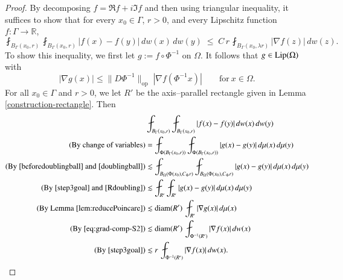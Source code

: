 \documentclass[12pt]{amsart}
\begin{document}
\begin{proof}
By decomposing $f=\Re f+i\Im f$ and then using triangular inequality, it suffices to show that for every $x_0\in\Gamma$, $r>0$, and every Lipschitz function $f:\Gamma\to\mathbb{R}$,
\begin{equation}\label{eq:Poincare11-chamber}
\fint_{B_\Gamma(x_0,r)}\fint_{B_\Gamma(x_0,r)}
\big|f(x)-f(y)\big|\,dw(x)\,dw(y)
\;\le\;
C\,r\,\fint_{B_\Gamma(x_0,\lambda r)} |\nabla f(z)|\,dw(z).
\end{equation}
To show this inequality, we first let $g:=f\circ\Phi^{-1}$ on $\Omega$. It follows that $g\in{\rm Lip}(\Omega)$ with
\begin{equation}\label{eq:grad-comp-S2}
|\nabla g(x)|
 \le
\|D\Phi^{-1}\|_{\mathrm{op}}\;|\nabla f(\Phi^{-1}x)|
\qquad\text{for}\ x\in\Omega.
\end{equation}
For all $x_0\in\Gamma$ and $r>0$, we let $R'$ be the axis--parallel rectangle given in Lemma \ref{construction-rectangle}. Then
\begin{align}\label{plugterm}
&\fint_{B_\Gamma(x_0,r)}\fint_{B_\Gamma(x_0,r)}|f(x)-f(y)|\,dw(x)\,dw(y)\nonumber\\
(\text{By change of variables})&=
\fint_{\Phi(B_\Gamma(x_0,r))}\fint_{\Phi(B_\Gamma(x_0,r))}|g(x)-g(y)|\,d\mu(x)\,d\mu(y)\nonumber\\
(\text{By}\ \eqref{beforedoublingball}\ \text{and}\ \eqref{doublingball})&\lesssim
\fint_{B_{\Omega}(\Phi(x_0),C_\Phi r)}\fint_{B_{\Omega}(\Phi(x_0),C_\Phi r)}|g(x)-g(y)|\,d\mu(x)\,d\mu(y)\nonumber\\
(\text{By}\ \eqref{step3goal}\ \text{and}\ \eqref{Rdoubling})&\lesssim
\fint_{R'}\fint_{R'}|g(x)-g(y)|\,d\mu(x)\,d\mu(y)\nonumber\\
(\text{By Lemma}\ \ref{lem:reducePoincare})&\lesssim {\rm diam}(R')\,\fint_{R'} |\nabla g(x)|\,d\mu(x)\nonumber\\
(\text{By}\ \eqref{eq:grad-comp-S2})&\lesssim {\rm diam}(R')\,
\fint_{\Phi^{-1}(R')} |\nabla f(x)|\,dw(x)\nonumber\\
(\text{By}\  \eqref{step3goal})&\lesssim r\,
\fint_{\Phi^{-1}(R')} |\nabla f(x)|\,dw(x).
\end{align}





\end{proof}
\end{document}
